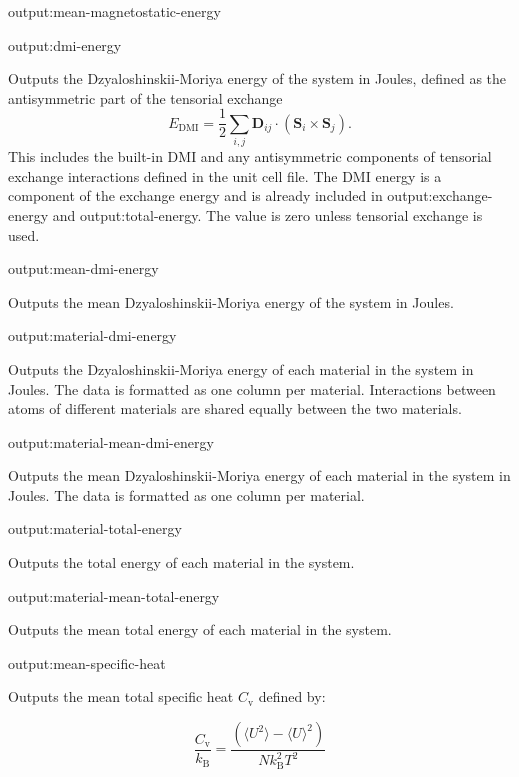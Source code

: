 {\zicf output:mean-magnetostatic-energy}

{\zicf output:dmi-energy} Outputs the Dzyaloshinskii-Moriya energy of the system in Joules, defined as the antisymmetric part of the tensorial exchange
\begin{equation*}
E_{\mathrm{DMI}} = \frac{1}{2}\sum_{i,j} \mathbf{D}_{ij} \cdot \left(\mathbf{S}_i \times \mathbf{S}_j\right).
\end{equation*}
\noindent This includes the built-in DMI and any antisymmetric components of tensorial exchange interactions defined in the unit cell file. The DMI energy is a component of the exchange energy and is already included in {\zicf output:exchange-energy} and {\zicf output:total-energy}. The value is zero unless tensorial exchange is used.

{\zicf output:mean-dmi-energy} Outputs the mean Dzyaloshinskii-Moriya energy of the system in Joules.

{\zicf output:material-dmi-energy} Outputs the Dzyaloshinskii-Moriya energy of each material in the system in Joules. The data is formatted as one column per material. Interactions between atoms of different materials are shared equally between the two materials.

{\zicf output:material-mean-dmi-energy} Outputs the mean Dzyaloshinskii-Moriya energy of each material in the system in Joules. The data is formatted as one column per material.

{\zicf output:material-total-energy} Outputs the total energy of each material in the system.

{\zicf output:material-mean-total-energy} Outputs the mean total energy of each material in the system.

{\zicf output:mean-specific-heat} Outputs the mean total specific heat $C_{\mathrm{v}}$ defined by:

\begin{equation*}
\frac{C_{\mathrm{v}}}{k_{\mathrm{B}}} = \frac{\left(\langle U^2 \rangle - \langle U \rangle^2 \right)}{N k_{\mathrm{B}}^2 T^2}
\end{equation*}

